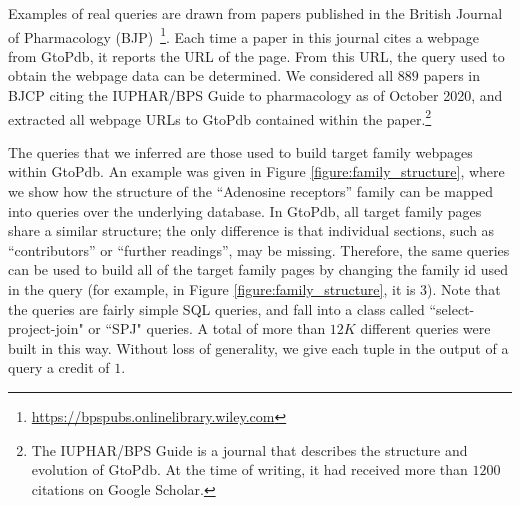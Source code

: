 \documentclass[preprint,12pt,sort&compress]{elsarticle}
\newcommand{\eat}[1]{}
\begin{document}


Examples of real queries are drawn from papers published in the British Journal of Pharmacology (BJP)~\footnote{\url{https://bpspubs.onlinelibrary.wiley.com}}.  Each time a paper in this journal cites a webpage from GtoPdb, it reports the URL of the page. From this URL, the query used to obtain the webpage data can be determined. 
We considered all $889$ papers in BJCP citing the IUPHAR/BPS Guide to pharmacology \citep{iuphar2018} as of October 2020, and extracted all webpage URLs to GtoPdb contained within the paper.\footnote{The IUPHAR/BPS Guide is a journal that describes the structure and evolution of GtoPdb. At the time of writing, it had received more than $1200$ citations on Google Scholar.}

\eat{
There are eight target family webpages linked from the GtoPdb website: \emph{GPCR}, \emph{Ion channels}, \emph{NHRs}, \emph{Kinases}, \emph{Catalytic receptors}, \emph{Transporters}, \emph{Enzymes} and \emph{Other protein targets}.}
The queries that we inferred are those used to build target family webpages within GtoPdb.
An example was given in Figure \ref{figure:family_structure}, where we show how the structure of the ``Adenosine receptors'' family can be mapped into  queries over the underlying database. %
In GtoPdb, all target family pages share a similar structure; the only difference is that individual sections, such as ``contributors'' or ``further readings'', may be missing.
Therefore, the same queries can be used to build all of the target family pages by changing the family id used in the query (for example, in Figure \ref{figure:family_structure}, it is 3).
Note that the queries are fairly simple SQL queries, and fall into a class called ``select-project-join" or ``SPJ" queries. 
A total of more than $12K$ different queries were built in this way.
Without loss of generality, we give each tuple in the output of a query a credit of $1$.
\end{document}
